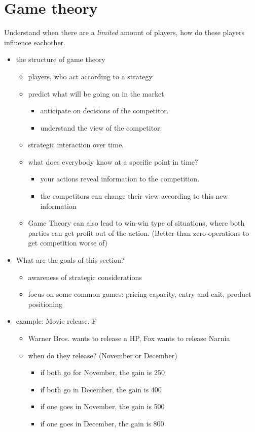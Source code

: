 \documentclass[12pt, a4paper, titlepage]{extarticle}
\begin{document}
\section{Game theory}
    Understand when there are a \textit{limited} amount of players, how do these players influence eachother.
    \begin{itemize}
        \item the structure of game theory
        \begin{itemize}
            \item players, who act according to a strategy
            \item predict what will be going on in the market
            \begin{itemize}
                \item anticipate on decisions of the competitor.
                \item understand the view of the competitor.
            \end{itemize}
            \item strategic interaction over time.
            \item what does everybody know at a specific point in time?
            \begin{itemize}
                \item your actions reveal information to the competition.
                \item the competitors can change their view according to this new information
            \end{itemize}
            \item Game Theory can also lead to win-win type of situations, where both parties can get profit out of the action. (Better than zero-operations to get competition worse of)
        \end{itemize}
        \item What are the goals of this section?
        \begin{itemize}
                \item awareness of strategic considerations
                \item focus on some common games: pricing capacity, entry and exit, product positioning
        \end{itemize}
        \item example: Movie release, F
        \begin{itemize}
            \item Warner Bros. wants to release a HP, Fox wants to release Narnia
            \item when do they release? (November or December)
            \begin{itemize}
                \item if both go for November, the gain is 250
                \item if both go in December, the gain is 400
                \item if one goes in November, the gain is 500
                \item if one goes in December, the gain is 800
            \end{itemize}
            

\end{itemize}
\end{itemize}
\end{document}
